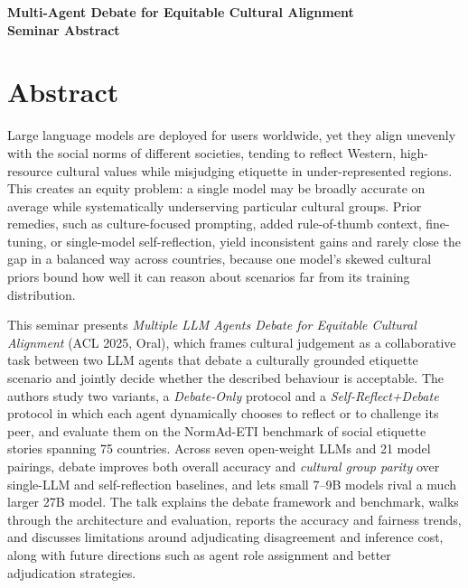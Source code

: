 \documentclass[11pt]{article}
\begin{document}
\begin{center}
{\LARGE\bfseries Multi-Agent Debate for Equitable Cultural Alignment}\\[1.1em]
{\large\bfseries Seminar Abstract}\\[0.6em]
{\normalsize \seminarDate}
\end{center}
\vspace{0.6em}
\section*{Abstract}
Large language models are deployed for users worldwide, yet they align unevenly with the social norms of different societies, tending to reflect Western, high-resource cultural values while misjudging etiquette in under-represented regions. This creates an equity problem: a single model may be broadly accurate on average while systematically underserving particular cultural groups. Prior remedies, such as culture-focused prompting, added rule-of-thumb context, fine-tuning, or single-model self-reflection, yield inconsistent gains and rarely close the gap in a balanced way across countries, because one model's skewed cultural priors bound how well it can reason about scenarios far from its training distribution.

This seminar presents \emph{Multiple LLM Agents Debate for Equitable Cultural Alignment} (ACL 2025, Oral), which frames cultural judgement as a collaborative task between two LLM agents that debate a culturally grounded etiquette scenario and jointly decide whether the described behaviour is acceptable. The authors study two variants, a \emph{Debate-Only} protocol and a \emph{Self-Reflect+Debate} protocol in which each agent dynamically chooses to reflect or to challenge its peer, and evaluate them on the NormAd-ETI benchmark of social etiquette stories spanning 75 countries. Across seven open-weight LLMs and 21 model pairings, debate improves both overall accuracy and \emph{cultural group parity} over single-LLM and self-reflection baselines, and lets small 7--9B models rival a much larger 27B model. The talk explains the debate framework and benchmark, walks through the architecture and evaluation, reports the accuracy and fairness trends, and discusses limitations around adjudicating disagreement and inference cost, along with future directions such as agent role assignment and better adjudication strategies.
\end{document}
